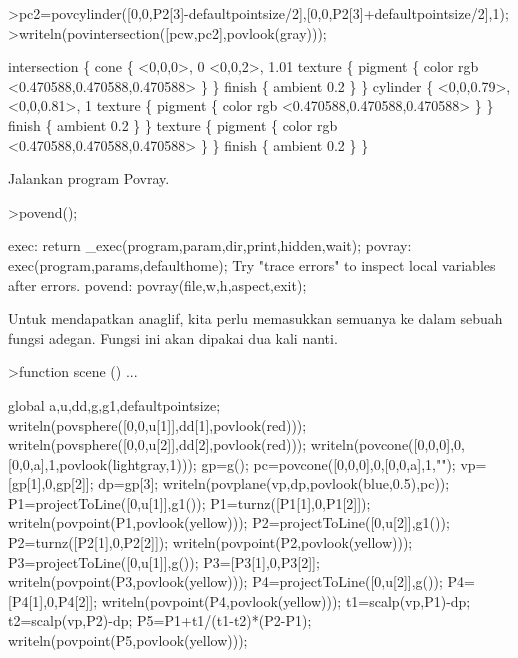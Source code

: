 \documentclass[a4paper,10pt]{article}
\begin{document}
\begin{eulernotebook}
\begin{eulercomment}
\begin{eulercomment}
\begin{eulercomment}
\begin{eulercomment}
\begin{eulercomment}
\begin{eulercomment}
\begin{eulercomment}
\begin{eulercomment}
\begin{eulercomment}
\begin{eulercomment}
\begin{eulercomment}
\begin{eulercomment}
\begin{eulercomment}
\begin{eulercomment}
\begin{eulercomment}
\begin{eulercomment}
\begin{eulerprompt}
>pc2=povcylinder([0,0,P2[3]-defaultpointsize/2],[0,0,P2[3]+defaultpointsize/2],1);
>writeln(povintersection([pcw,pc2],povlook(gray)));
\end{eulerprompt}
\begin{euleroutput}
  intersection \{ cone \{ <0,0,0>, 0 <0,0,2>, 1.01 texture \{ pigment \{ color rgb <0.470588,0.470588,0.470588> \}  \} 
   finish \{ ambient 0.2 \} 
   \}
  cylinder \{ <0,0,0.79>, <0,0,0.81>, 1
   texture \{ pigment \{ color rgb <0.470588,0.470588,0.470588> \}  \} 
   finish \{ ambient 0.2 \} 
   \}
   texture \{ pigment \{ color rgb <0.470588,0.470588,0.470588> \}  \} 
   finish \{ ambient 0.2 \} 
   \}
\end{euleroutput}
\begin{eulercomment}
Jalankan program Povray.
\end{eulercomment}
\begin{eulerprompt}
>povend();
\end{eulerprompt}
\begin{euleroutput}
  exec:
      return _exec(program,param,dir,print,hidden,wait);
  povray:
      exec(program,params,defaulthome);
  Try "trace errors" to inspect local variables after errors.
  povend:
      povray(file,w,h,aspect,exit); 
\end{euleroutput}
\begin{eulercomment}
Untuk mendapatkan anaglif, kita perlu memasukkan semuanya ke dalam sebuah fungsi adegan.
Fungsi ini akan dipakai dua kali nanti.
\end{eulercomment}
\begin{eulerprompt}
>function scene () ...
\end{eulerprompt}
\begin{eulerudf}
  global a,u,dd,g,g1,defaultpointsize;
  writeln(povsphere([0,0,u[1]],dd[1],povlook(red)));
  writeln(povsphere([0,0,u[2]],dd[2],povlook(red)));
  writeln(povcone([0,0,0],0,[0,0,a],1,povlook(lightgray,1)));
  gp=g();
  pc=povcone([0,0,0],0,[0,0,a],1,"");
  vp=[gp[1],0,gp[2]]; dp=gp[3];
  writeln(povplane(vp,dp,povlook(blue,0.5),pc));
  P1=projectToLine([0,u[1]],g1()); P1=turnz([P1[1],0,P1[2]]);
  writeln(povpoint(P1,povlook(yellow)));
  P2=projectToLine([0,u[2]],g1()); P2=turnz([P2[1],0,P2[2]]);
  writeln(povpoint(P2,povlook(yellow)));
  P3=projectToLine([0,u[1]],g()); P3=[P3[1],0,P3[2]];
  writeln(povpoint(P3,povlook(yellow)));
  P4=projectToLine([0,u[2]],g()); P4=[P4[1],0,P4[2]];
  writeln(povpoint(P4,povlook(yellow)));
  t1=scalp(vp,P1)-dp; t2=scalp(vp,P2)-dp; P5=P1+t1/(t1-t2)*(P2-P1);
  writeln(povpoint(P5,povlook(yellow)));

\end{eulerudf}
\end{eulercomment}
\end{eulercomment}
\end{eulercomment}
\end{eulercomment}
\end{eulercomment}
\end{eulercomment}
\end{eulercomment}
\end{eulercomment}
\end{eulercomment}
\end{eulercomment}
\end{eulercomment}
\end{eulercomment}
\end{eulercomment}
\end{eulercomment}
\end{eulercomment}
\end{eulercomment}
\end{eulernotebook}
\end{document}
